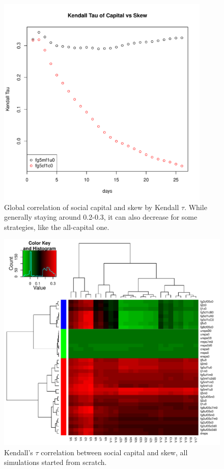 \documentclass[10pt,oneside]{memoir}
\begin{document}
\begin{Spacing}{2}
\begin{figure}
\begin{center}
    \includegraphics[width=4in]{figures/kendall-tau-fg5mf1u0-fg5cf1c0}
    \caption{Global correlation of social capital and skew by Kendall $\tau$.  While generally staying around 0.2-0.3, it can also decrease for some strategies, like the all-capital one.}
    \label{figure:kendall-tau-fg5mf1u0-fg5cf1c0}
\end{center}
\end{figure}

\begin{figure}
\begin{center}
    \includegraphics{figures/crop/heatmap-cstau-0wk}
    \caption{Kendall’s $\tau$ correlation between social capital and skew, all simulations started from scratch.}
    \label{figure:heatmap-cstau-0wk}
\end{center}
\end{figure}


\end{Spacing}
\end{document}
